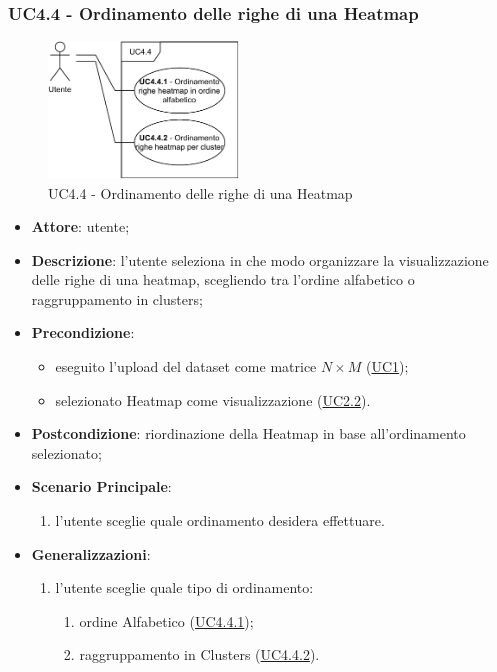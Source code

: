     \subsubsection{UC4.4 - Ordinamento delle righe di una Heatmap}
    \label{uc4.4}
    \begin{figure}[htbp]
        \centering
        \includegraphics[width=0.45\textwidth]{source/sections/casi-uso/diagrams/uc4_4.pdf}
        \caption{UC4.4 - Ordinamento delle righe di una Heatmap}
        \label{fig:uc4.4}
    \end{figure}
    \begin{itemize}
    \item \textbf{Attore}: utente;
    \item \textbf{Descrizione}: l'utente seleziona in che modo organizzare la visualizzazione delle righe di una heatmap, scegliendo tra l'ordine alfabetico o raggruppamento in clusters;
    \item \textbf{Precondizione}: 
    \begin{itemize}
        \item eseguito l'upload del dataset come matrice $N\times M$ (\hyperref[uc1]{UC1});
        \item selezionato Heatmap come visualizzazione (\hyperref[uc2.2]{UC2.2}).
    \end{itemize}  
    \item \textbf{Postcondizione}: riordinazione della Heatmap in base all'ordinamento selezionato;
    \item \textbf{Scenario Principale}: 
    \begin{enumerate}
        \item l'utente sceglie quale ordinamento desidera effettuare.
    \end{enumerate}  
    \item \textbf{Generalizzazioni}: 
     \begin{enumerate}
            \item l'utente sceglie quale tipo di ordinamento:
                \begin{enumerate}
                    \item ordine Alfabetico (\hyperref[uc4.4.1]{UC4.4.1});
                    \item raggruppamento in Clusters (\hyperref[uc4.4.2]{UC4.4.2}).
                    \end{enumerate}
        \end{enumerate} 
    \end{itemize}
    
